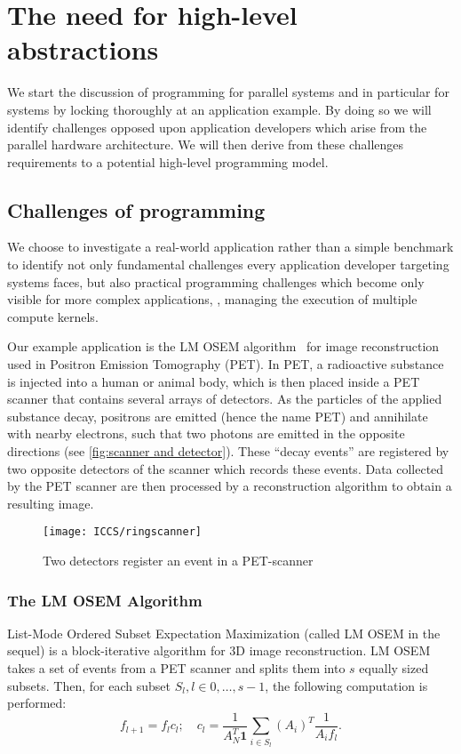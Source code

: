 \section{The need for high-level abstractions}
We start the discussion of programming for parallel systems and in particular for \GPU systems by locking thoroughly at an application example.
By doing so we will identify challenges opposed upon application developers which arise from the parallel hardware architecture.
We will then derive from these challenges requirements to a potential high-level programming model.


\subsection{Challenges of \GPU programming}
\label{section:opencl-example}
We choose to investigate a real-world application rather than a simple benchmark to identify not only fundamental challenges every application developer targeting \GPU systems faces, but also practical programming challenges which become only visible for more complex applications, \eg, managing the execution of multiple compute kernels.

Our example application is the LM OSEM algorithm~\cite{ReaderErFlOt1998, SchellmannGoMeKoScWuBu2009} for image reconstruction used in Positron Emission Tomography (PET).
In PET, a radioactive substance is injected into a human or animal body, which is then placed inside a PET scanner that contains several arrays of detectors.
As the particles of the applied substance decay, positrons are emitted (hence the name PET) and annihilate with nearby electrons, such that two photons are emitted in the opposite directions (see \autoref{fig:scanner and detector}).
These ``decay events'' are registered by two opposite detectors of the scanner which records these events.
Data collected by the PET scanner are then processed by a reconstruction algorithm to obtain a resulting image.

\begin{figure}
  \centering
  \texttt{[image: ICCS/ringscanner]}
  \caption{Two detectors register an event in a PET-scanner}
  \label{fig:scanner and detector}
\end{figure}

\subsubsection{The LM OSEM Algorithm}
List-Mode Ordered Subset Expectation Maximization \cite{ReaderErFlOt1998} (called LM OSEM in the sequel) is a block-iterative algorithm for 3D image reconstruction.
LM OSEM takes a set of events from a PET scanner and splits them into $s$ equally sized subsets.
Then, for each subset $S_l, l \in {0, \ldots, s-1}$, the following computation is performed:
\begin{equation}
  f_{l+1}=f_{l}c_{l};\quad c_{l}=\dfrac{1}{A_N^T \textbf{1}} \sum_{i \in S_{l}} (A_i)^T \dfrac{1}{A_{i} f_{l}}.
\label{equ:lm_osem}
\end{equation}

